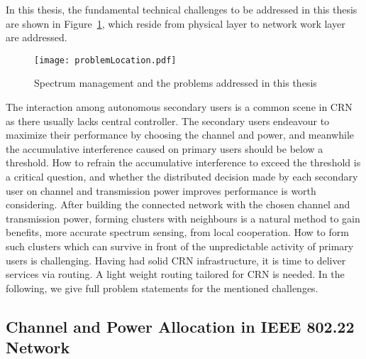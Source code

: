 In this thesis, the fundamental technical challenges to be addressed in this thesis are shown in Figure~\ref{problemLocation}, which reside from physical layer to network work layer~\cite{osi} are addressed. 


\begin{figure}[h!]
  \centering
  \texttt{[image: problemLocation.pdf]}
  \caption{Spectrum management and the problems addressed in this thesis}
\label{problemLocation}
\end{figure}

The interaction among autonomous secondary users is a common scene in CRN as there usually lacks central controller.
The secondary users endeavour to maximize their performance by choosing the channel and power, and meanwhile the accumulative interference caused on primary users should be below a threshold.
How to refrain the accumulative interference to exceed the threshold is a critical question, and whether the distributed decision made by each secondary user on channel and transmission power improves performance is worth considering.
After building the connected network with the chosen channel and transmission power, forming clusters with neighbours is a natural method to gain benefits, \ie more accurate spectrum sensing, from local cooperation.
How to form such clusters which can survive in front of the unpredictable activity of primary users is challenging.
Having had solid CRN infrastructure, it is time to deliver services via routing.
A light weight routing tailored for CRN is needed.
In the following, we give full problem statements for the mentioned challenges.



\subsection{Channel and Power Allocation in IEEE 802.22 Network}



